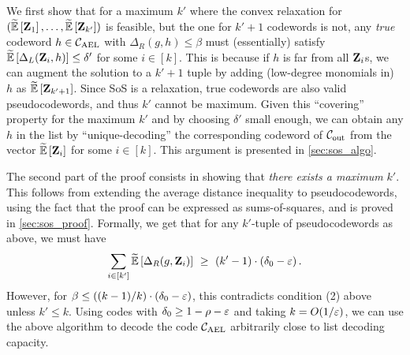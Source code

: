 We first show that for a maximum $k'$ where the convex relaxation for $(\tildeEx{\zee_1}, \ldots,
\tildeEx{\zee_{k'}})$ is feasible, but the one for $k'+1$ codewords is not, any \emph{true} codeword
$h \in { {\mathcal C}_{\mathrm{AEL}} }$ with $\Delta_R(g,h) \leq \beta$ must (essentially) satisfy $\tildeEx{\Delta_L(\zee_i, h)}
\leq \delta'$ for some $i \in [k]$. 
%
This is because if $h$ is far from all ${ \mathbf{Z} }_i$s, we can augment the solution to a $k'+1$ tuple by
adding (low-degree monomials in) $h$ as $\tildeEx{\zee_{k'+1}}$. 
%
Since SoS is a relaxation, true codewords are also valid pseudocodewords, and thus $k'$ cannot
be maximum.
%
%
Given this ``covering'' property for the maximum $k'$ and by choosing $\delta'$ small enough, we can
obtain any $h$ in the list by ``unique-decoding'' the corresponding codeword of ${\mathcal C}_{\mathrm{out}}$ from
the vector $\tildeEx{\zee_i}$ for some $i \in [k]$.
%
This argument is presented in \cref{sec:sos_algo}.

The second part of the proof consists in showing that \emph{there exists a maximum} $k'$. 
%
This follows from extending the average distance inequality to pseudocodewords, using the fact that
the proof can be expressed as sums-of-squares, and is proved in \cref{sec:sos_proof}. 
%
Formally, we get that for any $k'$-tuple of pseudocodewords as above, we must have
\[
\sum_{i \in [k']} \tildeEx{\Delta_R(g, \zee_i)} ~\geq~ (k' - 1) \cdot (\delta_0 - \eps) \mper
\]
%
However, for $\beta \leq ((k-1)/k) \cdot (\delta_0 - \varepsilon)$, this contradicts condition (2) above
unless $k' \leq k$. 
%
Using codes with $\delta_0 \geq 1 - \rho - \varepsilon$ and taking $k = O(1/\varepsilon)$, we can use the above
algorithm to decode the code ${ {\mathcal C}_{\mathrm{AEL}} }$ arbitrarily close to list decoding capacity.



